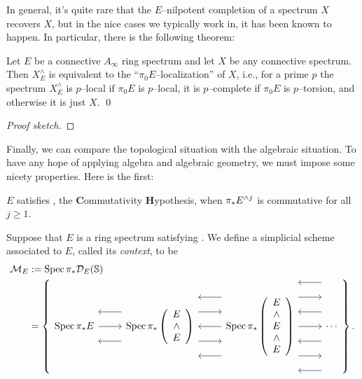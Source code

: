 In general, it's quite rare that the $E$--nilpotent completion of a spectrum $X$ recovers $X$, but in the nice cases we typically work in, it has been known to happen.  In particular, there is the following theorem:
\begin{lemma}
Let $E$ be a connective $A_\infty$ ring spectrum and let $X$ be any connective spectrum.  Then $X^\wedge_E$ is equivalent to the ``$\pi_0 E$--localization'' of $X$, i.e., for a prime $p$ the spectrum $X^\wedge_E$ is $p$--local if $\pi_0 E$ is $p$--local, it is $p$--complete if $\pi_0 E$ is $p$--torsion, and otherwise it is just $X$. \qed
\end{lemma}
\begin{proof}[Proof sketch]
\end{proof}

Finally, we can compare the topological situation with the algebraic situation.  To have any hope of applying algebra and algebraic geometry, we must impose some nicety properties.  Here is the first:

\begin{definition}
$E$ satisfies \CH, the \textbf Commutativity \textbf Hypothesis, when $\pi_* E^{\wedge j}$ is commutative for all $j \ge 1$.
\end{definition}

\begin{definition}
Suppose that $E$ is a ring spectrum satisfying {\CH}.  We define a simplicial scheme associated to $E$, called its \textit{context}, to be
\begin{align*}
\mathcal{M}_E & := \Spec \pi_* \sheaf D_E(\S) \\
& = \left\{
\begin{tikzcd}[ampersand replacement=\&]
\Spec \pi_* E \arrow{r} \arrow[leftarrow,shift left=\baselineskip]{r} \arrow[leftarrow,shift right=\baselineskip]{r} \&
\Spec \pi_* \left( \begin{array}{c} E \\ \sm \\ E \end{array} \right) \arrow[leftarrow, shift left=(2*\baselineskip)]{r} \arrow[shift left=\baselineskip]{r} \arrow[leftarrow]{r} \arrow[shift right=\baselineskip]{r} \arrow[leftarrow, shift right=(2*\baselineskip)]{r} \&
\Spec \pi_* \left( \begin{array}{c} E \\ \sm \\ E \\ \sm \\ E \end{array} \right) \arrow[leftarrow, shift left=(3*\baselineskip)]{r} \arrow[shift left=(2*\baselineskip)]{r} \arrow[leftarrow, shift left=\baselineskip]{r} \arrow{r} \arrow[leftarrow, shift right=\baselineskip]{r} \arrow[shift right=(2*\baselineskip)]{r} \arrow[leftarrow, shift right=(3*\baselineskip)]{r} \&
\cdots
\end{tikzcd}
\right\}.
\end{align*}
\end{definition}

